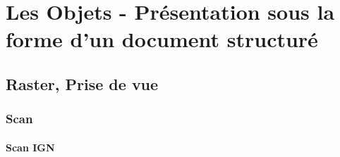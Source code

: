 \documentclass[12pt,titlepage,oneside]{book}
\begin{document}
\section{Les Objets - Présentation sous la forme d'un document structuré}

\vspace{\baselineskip}


\subsection{Raster, Prise de vue}
\subsubsection{\large Scan}
\paragraph{Scan IGN}
\noindent
\vspace{\baselineskip}
\end{document}
